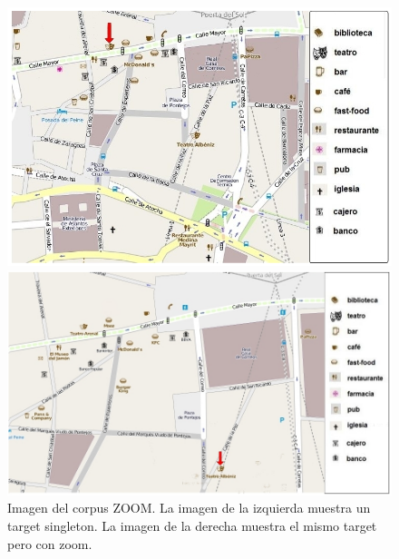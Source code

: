 \begin{figure}
\begin{minipage}[b]{0.48\linewidth}
\centering
\includegraphics[width=\textwidth]{images/corpus/mapa1.png}
\caption{}
\label{mapa13}
\end{minipage}
\hspace*{0cm}
\begin{minipage}[b]{0.55\linewidth}
\centering
\includegraphics[width=\textwidth]{images/corpus/mapa2.png}
\caption{}
\label{mapa14}
\end{minipage}
\caption{Imagen del corpus ZOOM. La imagen de la izquierda muestra un target singleton. La imagen de la derecha muestra el mismo target pero con zoom.}
\end{figure}

